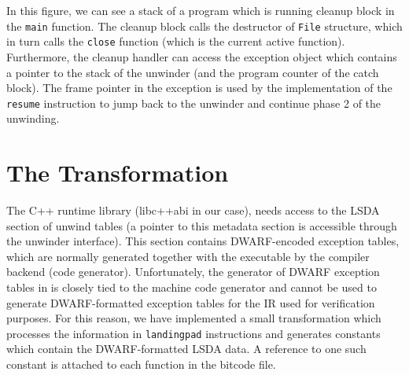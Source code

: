 \begin{widefigure}
\caption{In this figure, we can see a stack of a program which is running
cleanup block in the \texttt{main} function. The cleanup block calls the
destructor of \texttt{File} structure, which in turn calls the
\texttt{close} function (which is the current active function).
Furthermore, the cleanup handler can access the exception object which
contains a pointer to the stack of the unwinder (and the program counter of the catch block).
The frame pointer in the exception is used by the implementation of the
\texttt{resume} instruction to jump back to the unwinder and continue phase 2
of the unwinding.
}\label{fig:lang:treestack}
\end{widefigure}

\section{The \llvm{} Transformation}\label{sec:lang:transform}

The C++ runtime library (libc++abi in our case), needs access
to the LSDA section of unwind tables (a pointer to this metadata section
is accessible through the unwinder interface). This section contains
DWARF-encoded exception tables, which are normally generated together
with the executable by the compiler backend (code generator).
Unfortunately, the generator of DWARF exception tables in \llvm{} is
closely tied to the machine code generator and cannot be used to
generate DWARF-formatted exception tables for the \llvm{} IR used for
verification purposes.
For
this reason, we have implemented a small \llvm{} transformation which
processes the information in \texttt{landingpad} instructions and
generates \llvm{} constants which contain the DWARF-formatted LSDA data. A
reference to one such constant is attached to each function in the
bitcode file.

